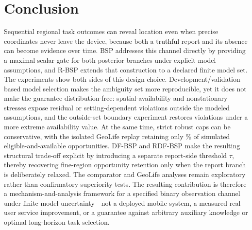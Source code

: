 \documentclass[10pt,journal,compsoc]{IEEEtran}
\begin{document}
\section{Conclusion}
Sequential regional task outcomes can reveal location even when precise coordinates never leave the device, because both a truthful report and its absence can become evidence over time. BSP addresses this channel directly by providing a maximal scalar gate for both posterior branches under explicit model assumptions, and R-BSP extends that construction to a declared finite model set. The experiments show both sides of this design choice. Development/validation-based model selection makes the ambiguity set more reproducible, yet it does not make the guarantee distribution-free: spatial-availability and nonstationary stresses expose residual or setting-dependent violations outside the modeled assumptions, and the outside-set boundary experiment restores violations under a more extreme availability value. At the same time, strict robust caps can be conservative, with the isolated GeoLife replay retaining only \GeoStrictRet\% of simulated eligible-and-available opportunities. DF-BSP and RDF-BSP make the resulting structural trade-off explicit by introducing a separate report-side threshold $\tau$, thereby recovering fine-region opportunity retention only when the report branch is deliberately relaxed. The comparator and GeoLife analyses remain exploratory rather than confirmatory superiority tests. The resulting contribution is therefore a mechanism-and-analysis framework for a specified binary observation channel under finite model uncertainty---not a deployed mobile system, a measured real-user service improvement, or a guarantee against arbitrary auxiliary knowledge or optimal long-horizon task selection.



\end{document}
